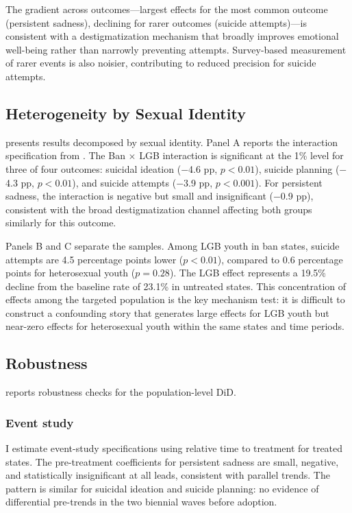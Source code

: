 \documentclass[12pt]{article}
\begin{document}
The gradient across outcomes---largest effects for the most common outcome (persistent sadness), declining for rarer outcomes (suicide attempts)---is consistent with a destigmatization mechanism that broadly improves emotional well-being rather than narrowly preventing attempts. Survey-based measurement of rarer events is also noisier, contributing to reduced precision for suicide attempts.



\subsection{Heterogeneity by Sexual Identity}

 presents results decomposed by sexual identity. Panel A reports the interaction specification from . The Ban $\times$ LGB interaction is significant at the 1\% level for three of four outcomes: suicidal ideation ($-$4.6 pp, $p < 0.01$), suicide planning ($-$4.3 pp, $p < 0.01$), and suicide attempts ($-$3.9 pp, $p < 0.001$). For persistent sadness, the interaction is negative but small and insignificant ($-$0.9 pp), consistent with the broad destigmatization channel affecting both groups similarly for this outcome.

Panels B and C separate the samples. Among LGB youth in ban states, suicide attempts are 4.5 percentage points lower ($p < 0.01$), compared to 0.6 percentage points for heterosexual youth ($p = 0.28$). The LGB effect represents a 19.5\% decline from the baseline rate of 23.1\% in untreated states. This concentration of effects among the targeted population is the key mechanism test: it is difficult to construct a confounding story that generates large effects for LGB youth but near-zero effects for heterosexual youth within the same states and time periods.



\subsection{Robustness}

 reports robustness checks for the population-level DiD.

\subsubsection*{Event study} I estimate event-study specifications using relative time to treatment for treated states. The pre-treatment coefficients for persistent sadness are small, negative, and statistically insignificant at all leads, consistent with parallel trends. The pattern is similar for suicidal ideation and suicide planning: no evidence of differential pre-trends in the two biennial waves before adoption.
\end{document}
